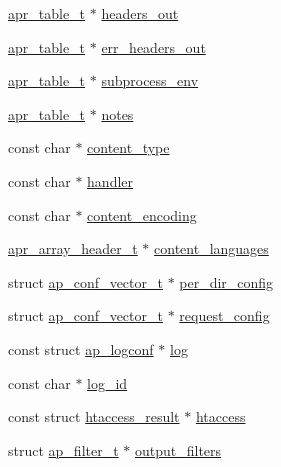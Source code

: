 \begin{DoxyCompactItemize}
\item 
\hyperlink{structapr__table__t}{apr\+\_\+table\+\_\+t} $\ast$ \hyperlink{structrequest__rec_afecc56ea8fb015aa52477dba471a6612}{headers\+\_\+out}
\item 
\hyperlink{structapr__table__t}{apr\+\_\+table\+\_\+t} $\ast$ \hyperlink{structrequest__rec_a9f49c2d5680987c0c28466ea37d41a62}{err\+\_\+headers\+\_\+out}
\item 
\hyperlink{structapr__table__t}{apr\+\_\+table\+\_\+t} $\ast$ \hyperlink{structrequest__rec_ad62304ef3728a69651588d8292c211a5}{subprocess\+\_\+env}
\item 
\hyperlink{structapr__table__t}{apr\+\_\+table\+\_\+t} $\ast$ \hyperlink{structrequest__rec_a53bf379e72ab617b95be314af47f0dcb}{notes}
\item 
const char $\ast$ \hyperlink{structrequest__rec_a20f5c95ec98dd85531697aae3acbb26b}{content\+\_\+type}
\item 
const char $\ast$ \hyperlink{structrequest__rec_a4fb5cec8fe63f73648e96a3af0dff91c}{handler}
\item 
const char $\ast$ \hyperlink{structrequest__rec_afc389b729286c795c92309374e3939a0}{content\+\_\+encoding}
\item 
\hyperlink{structapr__array__header__t}{apr\+\_\+array\+\_\+header\+\_\+t} $\ast$ \hyperlink{structrequest__rec_a081b966b6fd4bff3df9bf099c79bce2c}{content\+\_\+languages}
\item 
struct \hyperlink{group__APACHE__CORE__CONFIG_ga614684670dbf748a70ac6bad272da59c}{ap\+\_\+conf\+\_\+vector\+\_\+t} $\ast$ \hyperlink{structrequest__rec_adf4465ec1d98a6517c13216b1f4d30f5}{per\+\_\+dir\+\_\+config}
\item 
struct \hyperlink{group__APACHE__CORE__CONFIG_ga614684670dbf748a70ac6bad272da59c}{ap\+\_\+conf\+\_\+vector\+\_\+t} $\ast$ \hyperlink{structrequest__rec_ab3a381ecca6222a21777e53d0c5a0a14}{request\+\_\+config}
\item 
const struct \hyperlink{structap__logconf}{ap\+\_\+logconf} $\ast$ \hyperlink{structrequest__rec_aa4e9391d311a5332c826c8e69d647c9d}{log}
\item 
const char $\ast$ \hyperlink{structrequest__rec_a9c1a387edd3a86bf8516ad3765243d93}{log\+\_\+id}
\item 
const struct \hyperlink{structhtaccess__result}{htaccess\+\_\+result} $\ast$ \hyperlink{structrequest__rec_a59801b64e506082b8e163adcdd7644b0}{htaccess}
\item 
struct \hyperlink{structap__filter__t}{ap\+\_\+filter\+\_\+t} $\ast$ \hyperlink{structrequest__rec_a2ef584f8431c6b1cde8f79435f39e84a}{output\+\_\+filters}

\end{DoxyCompactItemize}
